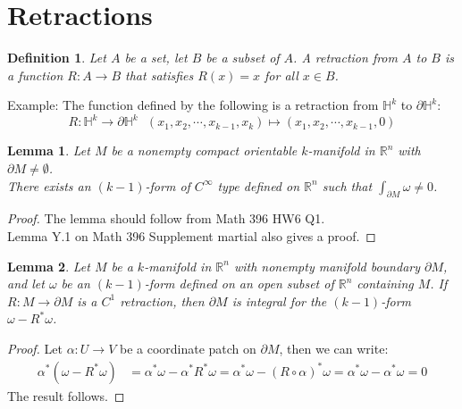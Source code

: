 \documentclass[15pt]{book}
\theoremstyle{break}
\theoremstyle{break}
\newtheorem{lem}{Lemma}[thm]
\newtheorem{defn}{Definition}[corL]
\newcommand{\R}{\mathbb{R}}
\newcommand{\example}{\color{green}Example: \color{black}}
\begin{document}
\newpage


\section[Retractions]{\color{red}Retractions\color{black}}
\begin{defn}
Let $A$ be a set, let $B$ be a subset of $A$. A retraction from $A$ to $B$ is a function $R:A \to B$ that satisfies $R(x) = x$ for all $x \in B$. 
\end{defn}

\example The function defined by the following is a retraction from $\mathbb{H}^k$ to $\partial \mathbb{H}^k$: 
$$R:\mathbb{H}^k \to \partial \mathbb{H}^k \ \ \ (x_1,x_2,\cdots, x_{k-1}, x_k) \mapsto (x_1,x_2,\cdots, x_{k-1}, 0)$$

\begin{lem}
Let $M$ be a nonempty compact orientable $k$-manifold in $\R^n$ with $\partial M\neq \emptyset$. \\There exists an $(k-1)$-form of $C^\infty$ type defined on $\R^n$ such that $\int_{\partial M}\omega \neq 0$. 
\end{lem}
\begin{proof}
The lemma should follow from Math 396 HW6 Q1. \\
Lemma Y.1 on Math 396 Supplement martial also gives a proof.
\end{proof}

\begin{lem}
Let $M$ be a $k$-manifold in $\R^n$ with nonempty manifold boundary $\partial M$, and let $\omega$ be an $(k-1)$-form defined on an open subset of $\R^n$ containing $M$. If $R:M \to \partial M$ is a $C^1$ retraction, then $\partial M$ is integral for the $(k-1)$-form $\omega - R^*\omega$. 
\end{lem}
\begin{proof}
Let $\alpha:U \to V$ be a coordinate patch on $\partial M$, then we can write:
\begin{align*}
\alpha^*(\omega - R^*\omega) &= \alpha^*\omega  - \alpha^*R^*\omega= \alpha^*\omega - (R\circ \alpha)^*\omega= \alpha^*\omega - \alpha^*\omega=0
\end{align*} 
The result follows.
\end{proof}
\end{document}
